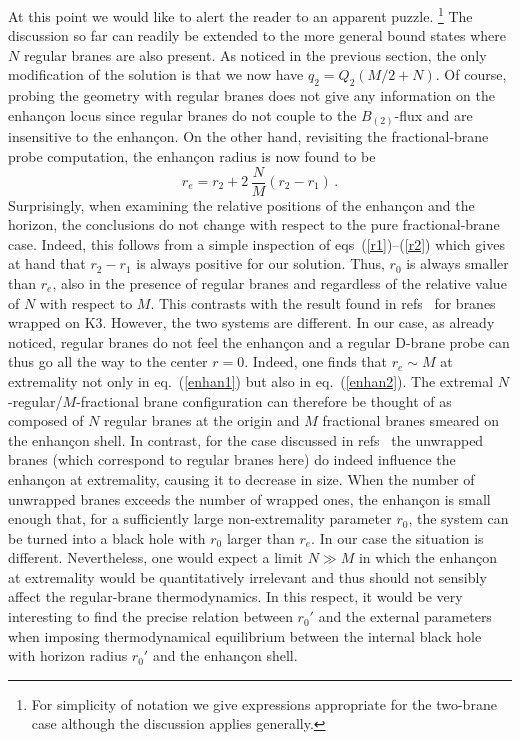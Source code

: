 \documentclass[a4paper,11pt]{article}
\newcommand{\eqref}[1]{(\ref{#1})}
\begin{document}
At this point we would like to alert the reader to an apparent puzzle.%
\footnote{For simplicity of notation we give expressions appropriate
for the two-brane case although the discussion applies generally.}
The discussion so far can readily be extended to the more general
bound states where $N$ regular branes are also present. As noticed in
the previous section, the only modification of the solution is that we
now have $q_2=Q_2 (M/2 + N)$. Of course, probing the geometry with
regular branes does not give any information on the enhan\c{c}on locus
since regular branes do not couple to the $B_{(2)}$-flux and are
insensitive to the enhan\c{c}on. On the other hand, revisiting the
fractional-brane probe computation, the enhan\c{c}on radius is now
found to be
\begin{equation}
\label{enhan2}
r_e = r_2 + 2\,\frac{N}{M}\left(r_2-r_1\right) \,.
\end{equation}
Surprisingly, when examining the relative positions of the
enhan\c{c}on and the horizon, the conclusions do not change with
respect to the pure fractional-brane case. Indeed, this follows from
a simple inspection of eqs~\eqref{r1}--\eqref{r2} which gives at hand
that $r_2-r_1$ is always positive for our solution. Thus, $r_0$ is
always smaller than $r_e$, also in the presence of  regular branes
and regardless of the relative value of $N$ with respect to $M$.
This contrasts with the result found in
refs~\cite{Johnson:1999qt,Johnson:2001wm} for branes wrapped on K3.
However, the two systems are different. In our case, as already noticed,
regular branes do not feel the enhan\c{c}on and a regular D-brane
probe can thus go all the way to the center $r=0$. Indeed, one finds
that $r_e \sim M$ at extremality not only in eq.~\eqref{enhan1} but
also in eq.~\eqref{enhan2}. The extremal $N$-regular/$M$-fractional
brane configuration can therefore be thought of as composed of $N$
regular branes at the origin and $M$ fractional branes smeared on the
enhan\c{c}on shell. In contrast, for the case discussed in
refs~\cite{Johnson:1999qt,Johnson:2001wm} the unwrapped branes (which
correspond to regular branes here) do indeed influence the enhan\c{c}on
at extremality, causing it to decrease in size. When the number of
unwrapped branes exceeds the number of wrapped ones, the enhan\c{c}on
is small enough that, for a sufficiently large non-extremality
parameter $r_0$, the system can be turned into a black hole with
$r_0$ larger than $r_e$. In our case the situation is different.
Nevertheless, one would expect a limit $N\gg M$ in which the
enhan\c{c}on at extremality would be quantitatively irrelevant and
thus should not sensibly affect the regular-brane thermodynamics. In
this respect, it would be very interesting to find the precise relation
between $r_0'$ and the external parameters when imposing thermodynamical
equilibrium between the internal black hole with horizon radius $r_0'$
and the enhan\c{c}on shell.
\end{document}
